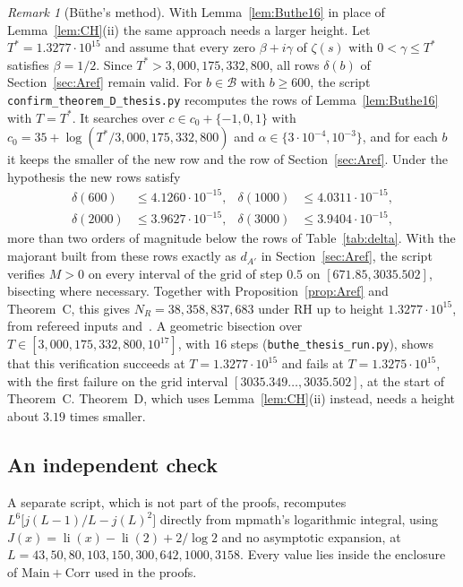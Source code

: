 \documentclass{amsart}
\theoremstyle{definition}
\theoremstyle{remark}
\newtheorem{remark}[theorem]{Remark}
\theoremstyle{plain}
\numberwithin{equation}{section}
\DeclareMathOperator{\li}{li}
\newcommand{\NN}{38{,}358{,}837{,}683}
\newcommand{\HRH}{3{,}000{,}175{,}332{,}800}
\newcommand{\Main}{\mathrm{Main}}
\newcommand{\Corr}{\mathrm{Corr}}
\newcommand{\TB}{1.3277\cdot10^{15}}
\begin{document}
\begin{remark}[B\"uthe's method]\label{rem:DButhe}
With Lemma~\ref{lem:Buthe16} in place of Lemma~\ref{lem:CH}(ii) the same approach needs a larger height. Let $T^*=\TB$ and assume that every zero $\beta+i\gamma$ of $\zeta(s)$ with $0<\gamma\le T^*$ satisfies $\beta=1/2$. Since $T^*>\HRH$, all rows $\delta(b)$ of Section~\ref{sec:Aref} remain valid. For $b\in\mathcal B$ with $b\ge600$, the script \texttt{confirm\_theorem\_D\_thesis.py} recomputes the rows of Lemma~\ref{lem:Buthe16} with $T=T^*$. It searches over $c\in c_0+\{-1,0,1\}$ with $c_0=35+\log(T^*/\HRH)$ and $\alpha\in\{3\cdot10^{-4},10^{-3}\}$, and for each $b$ it keeps the smaller of the new row and the row of Section~\ref{sec:Aref}. Under the hypothesis the new rows satisfy
\begin{align*}
\delta(600)&\le4.1260\cdot10^{-15}, & \delta(1000)&\le4.0311\cdot10^{-15},\\
\delta(2000)&\le3.9627\cdot10^{-15}, & \delta(3000)&\le3.9404\cdot10^{-15},
\end{align*}
more than two orders of magnitude below the rows of Table~\ref{tab:delta}. With the majorant built from these rows exactly as $d_{A'}$ in Section~\ref{sec:Aref}, the script verifies $M>0$ on every interval of the grid of step $0.5$ on $[671.85,3035.502]$, bisecting where necessary. Together with Proposition~\ref{prop:Aref} and Theorem~C, this gives $N_R=\NN$ under RH up to height $\TB$, from refereed inputs and~\cite{Bha24}. A geometric bisection over $T\in[\HRH,10^{17}]$, with $16$ steps (\texttt{buthe\_thesis\_run.py}), shows that this verification succeeds at $T=1.3277\cdot10^{15}$ and fails at $T=1.3275\cdot10^{15}$, with the first failure on the grid interval $[3035.349\ldots,3035.502]$, at the start of Theorem~C. Theorem~D, which uses Lemma~\ref{lem:CH}(ii) instead, needs a height about $3.19$ times smaller.
\end{remark}

\subsection{An independent check}\label{sec:crosscheck}
A separate script, which is not part of the proofs, recomputes $L^6\bigl[j(L-1)/L-j(L)^2\bigr]$ directly from mpmath's logarithmic integral, using $J(x)=\li(x)-\li(2)+2/\log2$ and no asymptotic expansion, at $L=43,50,80,103,150,300,642,1000,3158$. Every value lies inside the enclosure of $\Main+\Corr$ used in the proofs.

\end{document}
